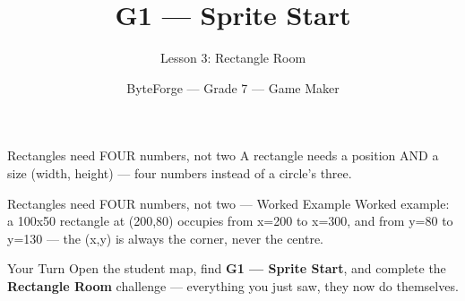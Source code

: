 \documentclass[aspectratio=169]{beamer}
\title{G1 — Sprite Start}
\subtitle{Lesson 3: Rectangle Room}
\author{ByteForge --- Grade 7 --- Game Maker}
\date{}
\begin{document}
\begin{frame}
    \titlepage
\end{frame}

\begin{frame}{Rectangles need FOUR numbers, not two}
    \Large
    A rectangle needs a position AND a size (width, height) — four numbers instead of a circle's three.

    \begin{center}
    \end{center}
\end{frame}

\begin{frame}{Rectangles need FOUR numbers, not two --- Worked Example}
    \Large
    Worked example: a 100x50 rectangle at (200,80) occupies from x=200 to x=300, and from y=80 to y=130 — the (x,y) is always the corner, never the centre.
\end{frame}

\begin{frame}{Your Turn}
    \Large
    Open the student map, find \textbf{G1 — Sprite Start}, and complete
    the \textbf{Rectangle Room} challenge --- everything you just saw, they now do themselves.
\end{frame}
\end{document}
